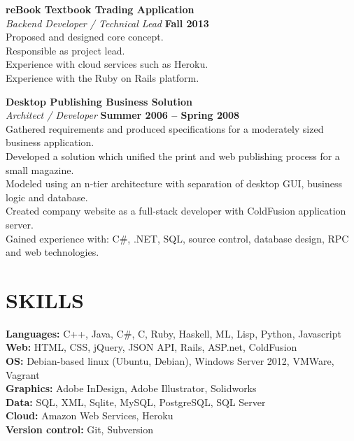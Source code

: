 \documentclass[margin,line]{resume}
\begin{document}
\begin{resume}
    \textbf{\listing reBook Textbook Trading Application} \vspace{2mm}\\\vspace{1mm}%
    \textsl{Backend Developer / Technical Lead} \hfill \textbf{Fall 2013}\\
    Proposed and designed core concept.\\
    Responsible as project lead.\\
    Experience with cloud services such as Heroku.\\
    Experience with the Ruby on Rails platform.

    \textbf{\listing Desktop Publishing Business Solution} \vspace{2mm}\\\vspace{1mm}%
    \textsl{Architect / Developer} \hfill \textbf{Summer 2006 -- Spring 2008}\\
    Gathered requirements and produced specifications for a moderately sized business application.\\
    Developed a solution which unified the print and web publishing process for a small magazine.\\
    Modeled using an n-tier architecture with separation of desktop GUI, business logic and database.\\
    Created company website as a full-stack developer with ColdFusion application server.\\
    Gained experience with: C\#, .NET, SQL, source control, database design, RPC and web technologies.
    

\sectionline

    \section{\mysidestyle \textbf{\large{S}\small{KILLS}}}

    \textbf{Languages:} C++, Java, C\#, C, Ruby, Haskell, ML, Lisp, Python, Javascript\\
    \textbf{Web:} HTML, CSS, jQuery, JSON API, Rails, ASP.net, ColdFusion\\
    \textbf{OS:} Debian-based linux (Ubuntu, Debian), Windows Server 2012, VMWare, Vagrant\\
    \textbf{Graphics:} Adobe InDesign, Adobe Illustrator, Solidworks\\
    \textbf{Data:} SQL, XML, Sqlite, MySQL, PostgreSQL, SQL Server\\
    \textbf{Cloud:} Amazon Web Services, Heroku\\
    \textbf{Version control:} Git, Subversion

\end{resume}
\end{document}
